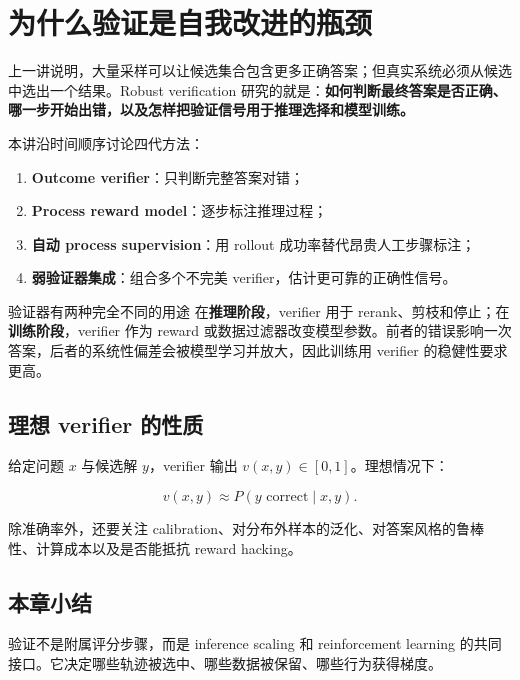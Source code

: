 \documentclass[a4paper]{article}
\begin{document}
\makelecturetitle

\section{为什么验证是自我改进的瓶颈}

上一讲说明，大量采样可以让候选集合包含更多正确答案；但真实系统必须从候选中选出一个结果。Robust verification 研究的就是：\textbf{如何判断最终答案是否正确、哪一步开始出错，以及怎样把验证信号用于推理选择和模型训练。}

本讲沿时间顺序讨论四代方法：

\begin{enumerate}
    \item \textbf{Outcome verifier}：只判断完整答案对错；
    \item \textbf{Process reward model}：逐步标注推理过程；
    \item \textbf{自动 process supervision}：用 rollout 成功率替代昂贵人工步骤标注；
    \item \textbf{弱验证器集成}：组合多个不完美 verifier，估计更可靠的正确性信号。
\end{enumerate}

\begin{importantbox}{验证器有两种完全不同的用途}
在\textbf{推理阶段}，verifier 用于 rerank、剪枝和停止；在\textbf{训练阶段}，verifier 作为 reward 或数据过滤器改变模型参数。前者的错误影响一次答案，后者的系统性偏差会被模型学习并放大，因此训练用 verifier 的稳健性要求更高。
\end{importantbox}

\subsection{理想 verifier 的性质}

给定问题 $x$ 与候选解 $y$，verifier 输出 $v(x,y)\in[0,1]$。理想情况下：

$$
v(x,y)\approx P(y\text{ correct}\mid x,y).
$$

除准确率外，还要关注 calibration、对分布外样本的泛化、对答案风格的鲁棒性、计算成本以及是否能抵抗 reward hacking。

\subsection{本章小结}

验证不是附属评分步骤，而是 inference scaling 和 reinforcement learning 的共同接口。它决定哪些轨迹被选中、哪些数据被保留、哪些行为获得梯度。
\end{document}
